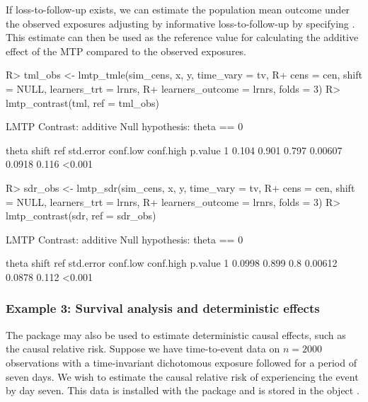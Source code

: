 \documentclass[]{jss}
\begin{document}
If loss-to-follow-up exists, we can estimate the population mean
outcome under the observed exposures adjusting by informative
loss-to-follow-up by specifying . This estimate can
then be used as the reference value for calculating the additive
effect of the MTP compared to the observed exposures.

\begin{CodeChunk}

\begin{CodeInput}
R> tml_obs <- lmtp_tmle(sim_cens, x, y, time_vary = tv, 
R+                      cens = cen, shift = NULL, learners_trt = lrnrs, 
R+                      learners_outcome = lrnrs, folds = 3)
R> lmtp_contrast(tml, ref = tml_obs)
\end{CodeInput}

\begin{CodeOutput}
  LMTP Contrast: additive
Null hypothesis: theta == 0

  theta shift   ref std.error conf.low conf.high p.value
1 0.104 0.901 0.797   0.00607   0.0918     0.116  <0.001
\end{CodeOutput}

\begin{CodeInput}
R> sdr_obs <- lmtp_sdr(sim_cens, x, y, time_vary = tv, 
R+                     cens = cen, shift = NULL, learners_trt = lrnrs, 
R+                     learners_outcome = lrnrs, folds = 3)
R> lmtp_contrast(sdr, ref = sdr_obs)
\end{CodeInput}

\begin{CodeOutput}
  LMTP Contrast: additive
Null hypothesis: theta == 0

   theta shift ref std.error conf.low conf.high p.value
1 0.0998 0.899 0.8   0.00612   0.0878     0.112  <0.001
\end{CodeOutput}

\end{CodeChunk}

\hypertarget{example-3-survival-analysis-and-deterministic-effects}{%
\subsubsection{Example 3: Survival analysis and deterministic effects}\label{example-3-survival-analysis-and-deterministic-effects}}

The  package may also be used to estimate deterministic causal effects, such as the causal relative risk.
Suppose we have time-to-event data on \(n = 2000\) observations with a time-invariant dichotomous exposure followed for a
period of seven days. We wish to estimate the causal relative risk of experiencing the event by day seven. This data is
installed with the package and is stored in the object . 
\end{document}
